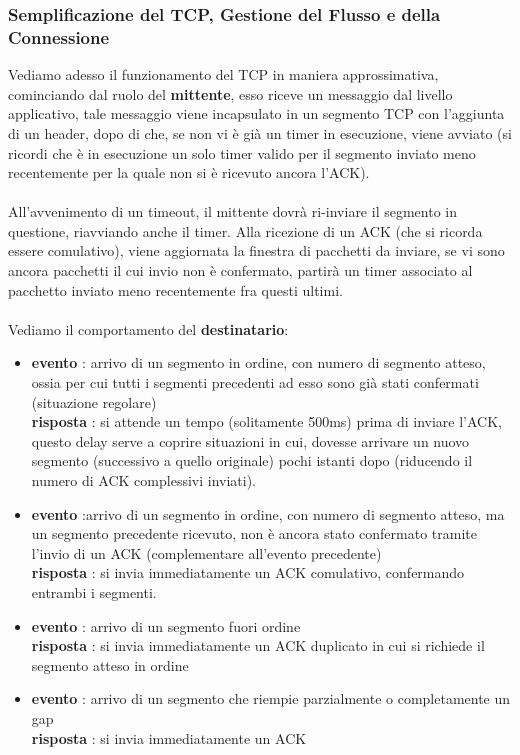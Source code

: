 \documentclass[12pt, letterpaper]{article}
\newcommand{\acc}{\\\hphantom{}\\}
\begin{document}
\subsubsection{Semplificazione del TCP, Gestione del Flusso e della Connessione}
Vediamo adesso il funzionamento del TCP in maniera approssimativa, cominciando dal ruolo del \textbf{mittente},
esso riceve un messaggio dal livello applicativo, tale messaggio viene incapsulato in un segmento TCP con
l'aggiunta di un header, dopo di che, se non vi è già un timer in esecuzione, viene avviato (si ricordi che
è in esecuzione un solo timer valido per il segmento inviato meno recentemente per la quale non si è ricevuto
ancora l'ACK).\acc
All'avvenimento di un timeout, il mittente dovrà ri-inviare il segmento in questione, riavviando anche il timer.
Alla ricezione di un ACK (che si ricorda essere comulativo), viene aggiornata la finestra di pacchetti
da inviare, se vi sono ancora pacchetti il cui invio non è confermato, partirà un timer associato al pacchetto
inviato meno recentemente fra questi ultimi.\acc Vediamo il comportamento del \textbf{destinatario}:\begin{itemize}
    \item \textbf{evento} : arrivo di un segmento in ordine,
          con numero di segmento atteso,
          ossia per cui tutti i segmenti precedenti  ad esso sono
          già stati confermati  (situazione regolare) \\ \textbf{risposta} : si attende un tempo (solitamente 500ms) prima
          di inviare l'ACK, questo delay serve a coprire
          situazioni in cui, dovesse arrivare un nuovo segmento (successivo a
          quello originale)  pochi istanti dopo (riducendo il numero di ACK
          complessivi inviati).
    \item \textbf{evento} :arrivo di un segmento in ordine, con numero
          di segmento atteso,  ma un segmento precedente ricevuto,
          non è ancora stato confermato
          tramite l'invio di un ACK (complementare
          all'evento precedente)\\
          \textbf{risposta} : si invia immediatamente un ACK comulativo,
          confermando entrambi i segmenti.
    \item \textbf{evento} : arrivo di un segmento fuori ordine\\
          \textbf{risposta} : si invia immediatamente un ACK duplicato in
          cui si richiede il segmento atteso in ordine
    \item \textbf{evento} : arrivo di un segmento che riempie
          parzialmente o completamente un gap\\
          \textbf{risposta} : si invia immediatamente un ACK
\end{itemize}
\end{document}
